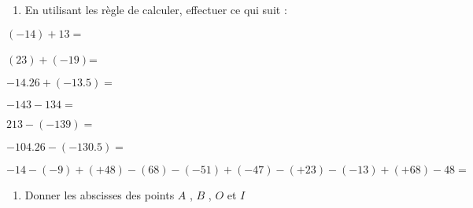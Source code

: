 \documentclass[a4paper,12pt]{article}
\begin{document}
\begin{exo}[7]
\begin{enumerate}
\item En utilisant les règle de calculer, effectuer ce qui suit : 
\end{enumerate}
\begin{multicols}{2}
$(-14)+13=$\anserline[2]
 
$(23)+(-19)$=\anserline[2]

$-14.26+(-13.5)=$\anserline[2]
\columnbreak

$-143-134=$\anserline[2]

$213-(-139)=$\anserline[2]
  
$-104.26-(-130.5)=$\anserline[2] 
\end{multicols}
$-14-(-9)+(+48)-(68)-(-51)+(-47)-(+23)-(-13)+(+68)-48=$

\anserline[2]
\end{exo}

\begin{exo}[4]
\begin{enumerate}
\item Donner les abscisses des points $A$ , $B$ , $O$ et $I$ 
\end{enumerate}

\anserline[5]
\end{exo}
\end{document}
